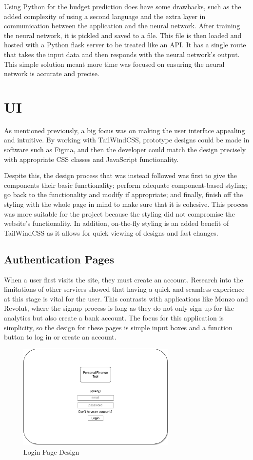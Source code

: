 Using Python for the budget prediction does have some drawbacks, such as the added complexity of using a second language and the extra layer in communication between the application and the neural network. After training the neural network, it is pickled and saved to a file. This file is then loaded and hosted with a Python flask server to be treated like an API. It has a single route that takes the input data and then responds with the neural network's output. This simple solution meant more time was focused on ensuring the neural network is accurate and precise.

\section{UI}
\label{sec:ui}
As mentioned previously, a big focus was on making the user interface appealing and intuitive. By working with TailWindCSS, prototype designs could be made in software such as Figma, and then the developer could match the design precisely with appropriate CSS classes and JavaScript functionality.

Despite this, the design process that was instead followed was first to give the components their basic functionality; perform adequate component-based styling; go back to the functionality and modify if appropriate; and finally, finish off the styling with the whole page in mind to make sure that it is cohesive. This process was more suitable for the project because the styling did not compromise the website's functionality. In addition, on-the-fly styling is an added benefit of TailWindCSS as it allows for quick viewing of designs and fast changes.

\subsection{Authentication Pages}
When a user first visits the site, they must create an account. Research into the limitations of other services showed that having a quick and seamless experience at this stage is vital for the user. This contrasts with applications like Monzo and Revolut, where the signup process is long as they do not only sign up for the analytics but also create a bank account. The focus for this application is simplicity, so the design for these pages is simple input boxes and a function button to log in or create an account.

\begin{figure}[H]
	\centering
	\includegraphics[width=0.7\textwidth]{images/login_specification.png}
	\caption{Login Page Design}
	\label{fig:LoginPage}
\end{figure}

